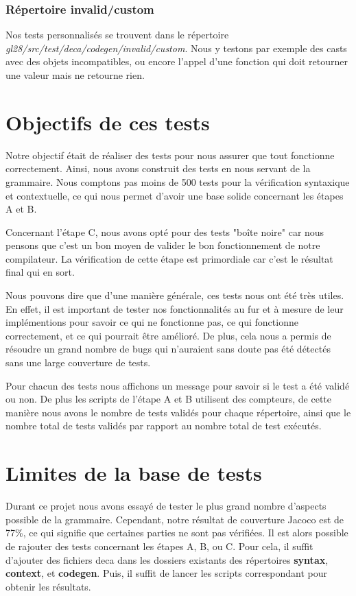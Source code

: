 \documentclass[12pt, a4paper, one side]{article}
\begin{document}
\subsubsection{Répertoire invalid/custom}
Nos tests personnalisés se trouvent dans le répertoire \newline
\textit{gl28/src/test/deca/codegen/invalid/custom}. Nous y testons par exemple des casts avec des objets incompatibles, ou encore l'appel d'une fonction qui doit retourner une valeur mais ne retourne rien.

\section{Objectifs de ces tests}
Notre objectif était de réaliser des tests pour nous assurer que tout fonctionne correctement. Ainsi, nous avons construit des tests en nous servant de la grammaire. Nous comptons pas moins de 500 tests pour la vérification syntaxique et contextuelle, ce qui nous permet d'avoir une base solide concernant les étapes A et B.

\begin{flushleft}
Concernant l'étape C, nous avons opté pour des tests "boîte noire" car nous pensons que c'est un bon moyen de valider le bon fonctionnement de notre compilateur. La vérification de cette étape est primordiale car c'est le résultat final qui en sort.
\end{flushleft}
\begin{flushleft}
Nous pouvons dire que d'une manière générale, ces tests nous ont été très utiles. En effet, il est important de tester nos fonctionnalités au fur et à mesure de leur implémentions pour savoir ce qui ne fonctionne pas, ce qui fonctionne correctement, et ce qui pourrait être amélioré. De plus, cela nous a permis de résoudre un grand nombre de bugs qui n'auraient sans doute pas été détectés sans une large couverture de tests.
\end{flushleft}
\begin{flushleft}
Pour chacun des tests nous affichons un message pour savoir si le test a été validé ou non. De plus les scripts de l'étape A et B utilisent des compteurs, de cette manière nous avons le nombre de tests validés pour chaque répertoire, ainsi que le nombre total de tests validés par rapport au nombre total de test exécutés.
\end{flushleft}

\section{Limites de la base de tests}
Durant ce projet nous avons essayé de tester le plus grand nombre d'aspects possible de la grammaire. Cependant, notre résultat de couverture Jacoco est de 77\%, ce qui signifie que certaines parties ne sont pas vérifiées. Il est alors possible de rajouter des tests concernant les étapes A, B, ou C. Pour cela, il suffit d'ajouter des fichiers deca dans les dossiers existants des répertoires \textbf{syntax}, \textbf{context}, et \textbf{codegen}. Puis, il suffit de lancer les scripts correspondant pour obtenir les résultats.
\end{document}
